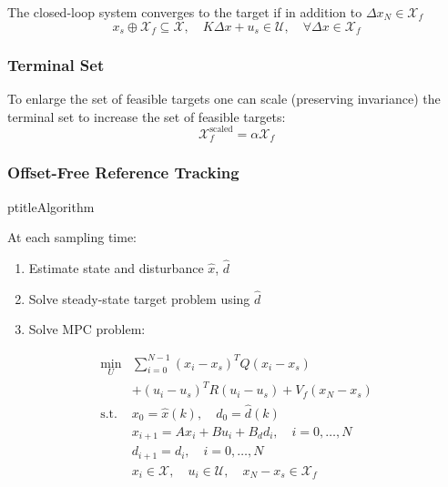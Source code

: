 
The closed-loop system converges to the target if in addition to $\Delta x_N \in \mathcal{X}_f$
\begin{equation*}
    x_s \oplus \mathcal{X}_f \subseteq \mathcal{X}, \quad K\Delta x + u_s \in \mathcal{U}, \quad \forall \Delta x \in \mathcal{X}_f
\end{equation*}

\subsubsection{Terminal Set}

To enlarge the set of feasible targets one can scale (preserving invariance) the terminal set to increase the set of feasible targets:
\begin{equation*}
    \mathcal{X}_f^{\text{scaled}} = \alpha \mathcal{X}_f
\end{equation*}

\subsubsection{Offset-Free Reference Tracking}
ptitle{Algorithm}

At each sampling time:
\begin{enumerate}
    \item Estimate state and disturbance $\widehat{x}$, $\widehat{d}$
    \item Solve steady-state target problem using $\widehat{d}$
    \item Solve MPC problem:
\end{enumerate}
\begin{align*}
    \min_U       & \sum_{i=0}^{N-1} {(x_i - x_s)}^T Q (x_i - x_s)                                    \\
                 & + {(u_i - u_s)}^T R (u_i - u_s) + V_f(x_N - x_s)                                  \\
    \text{s.t. } & x_0 = \widehat{x}(k), \quad d_0 = \widehat{d}(k)                                  \\
                 & x_{i+1} = Ax_i + Bu_i + B_d d_i, \quad i = 0, \dots, N                            \\
                 & d_{i+1} = d_i, \quad i = 0, \dots, N                                              \\
                 & x_i \in \mathcal{X}, \quad u_i \in \mathcal{U}, \quad x_N - x_s \in \mathcal{X}_f
\end{align*}


